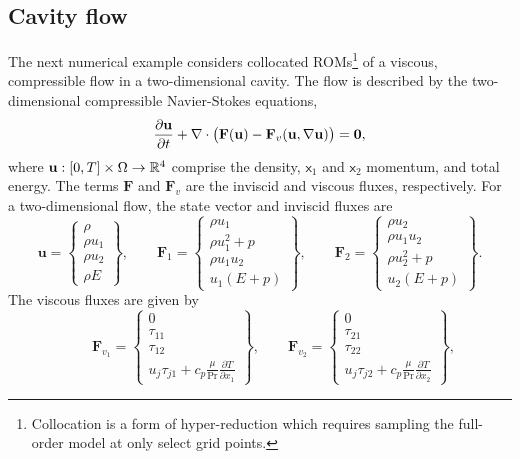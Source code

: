 \subsection{Cavity flow}
The next numerical example considers collocated ROMs\footnote{Collocation is a form of hyper-reduction which requires sampling the full-order model at only select grid points.} of a viscous, compressible flow in a two-dimensional cavity. 
The flow is described by the two-dimensional compressible Navier-Stokes equations,
\begin{equation}\label{eq:compressible_ns}
\frac{\partial \mathbf{u}}{\partial t} + \nabla \cdot \big( \mathbf{F}(\mathbf{u} ) - \mathbf{F}_v (\mathbf{u},\nabla \mathbf{u} )      \big) =\boldsymbol 0,
\end{equation}
where $\mathbf{u}: [0,T] \times \Omega \rightarrow \mathbb{R}^{4}$ comprise the density, $\mathsf{x}_1$ and $\mathsf{x}_2$ momentum, and total energy. The terms $\mathbf{F}$ and $ \mathbf{F}_v$ are the inviscid and viscous fluxes, respectively. For a two-dimensional flow, the state vector and inviscid fluxes are
$$
\mathbf{u} = \begin{Bmatrix}
\rho \\ \rho u_1 \\ \rho u_2 \\ \rho E \end{Bmatrix}, \qquad \mathbf{F}_{1} = \begin{Bmatrix} \rho u_1 \\ \rho u_1^2 +      p \\ \rho u_1 u_2 \\ u_1(E + p) \end{Bmatrix}, 
\qquad \mathbf{F}_{2} = \begin{Bmatrix} \rho u_2 \\ \rho u_1 u_2  \\ \rho u_2^2 + p \\ u_2(E + p) \end{Bmatrix}.
$$
The viscous fluxes are given by
$$
\qquad \mathbf{F}_{v_1} = \begin{Bmatrix} 0 \\ \tau_{11} \\ \tau_{12}  \\ u_j \tau_{j1} + c_p \frac{\mu}{\text{Pr}} \frac{\partial T}{\partial x_1}  \end{Bmatrix}, 
\qquad \mathbf{F}_{v_2} = \begin{Bmatrix} 0 \\ \tau_{21} \\ \tau_{22}  \\ u_j \tau_{j2} + c_p \frac{\mu}{\text{Pr}} \frac{\partial T}{\partial x_2}  \end{Bmatrix},
$$
